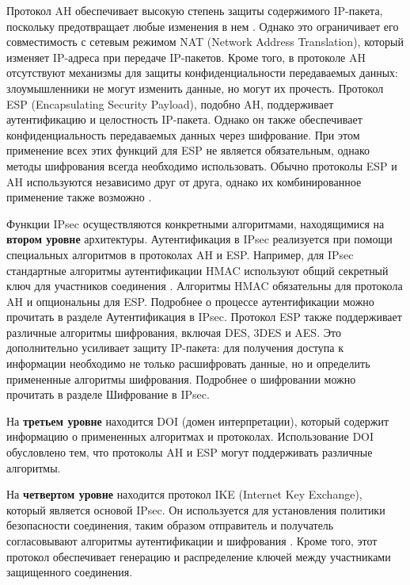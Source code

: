 Протокол AH обеспечивает высокую степень защиты содержимого IP-пакета, поскольку предотвращает любые изменения в нем \cite{ah}. Однако это ограничивает его совместимость с сетевым режимом NAT (Network Address Translation), который изменяет IP-адреса при передаче IP-пакетов. Кроме того, в протоколе AH отсутствуют механизмы для защиты конфиденциальности передаваемых данных: злоумышленники не могут изменить данные, но могут их прочесть. Протокол ESP (Encapsulating Security Payload), подобно AH, поддерживает аутентификацию и целостность IP-пакета. Однако он также обеспечивает конфиденциальность передаваемых данных через шифрование. При этом применение всех этих функций для ESP не является обязательным, однако методы шифрования всегда необходимо использовать. Обычно протоколы ESP и AH используются независимо друг от друга, однако их комбинированное применение также возможно \cite{ah}.

Функции IPsec осуществляются конкретными алгоритмами, находящимися на \textbf{втором уровне} архитектуры. Аутентификация в IPsec реализуется при помощи специальных алгоритмов в протоколах AH и ESP. Например, для IPsec стандартные алгоритмы аутентификации HMAC используют общий секретный ключ для участников соединения \cite{hmac}. Алгоритмы HMAC обязательны для протокола AH и опциональны для ESP. Подробнее о процессе аутентификации можно прочитать в разделе Аутентификация в IPsec. Протокол ESP также поддерживает различные алгоритмы шифрования, включая DES, 3DES и AES. Это дополнительно усиливает защиту IP-пакета: для получения доступа к информации необходимо не только расшифровать данные, но и определить примененные алгоритмы шифрования. Подробнее о шифровании можно прочитать в разделе Шифрование в IPsec.

На \textbf{третьем уровне} находится DOI (домен интерпретации), который содержит информацию о примененных алгоритмах и протоколах. Использование DOI обусловлено тем, что протоколы AH и ESP могут поддерживать различные алгоритмы.

На \textbf{четвертом уровне} находится протокол IKE (Internet Key Exchange), который является основой IPsec. Он используется для установления политики безопасности соединения, таким образом отправитель и получатель согласовывают алгоритмы аутентификации и шифрования \cite{ike}. Кроме того, этот протокол обеспечивает генерацию и распределение ключей между участниками защищенного соединения.

\pagebreak
